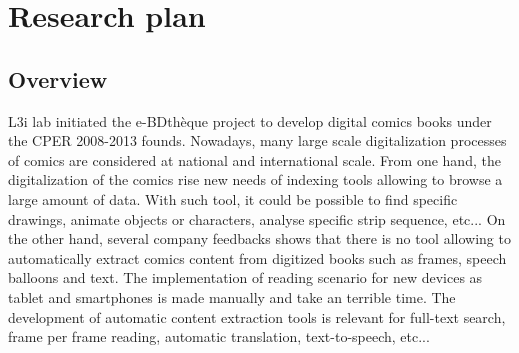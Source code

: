 \documentclass[final,12pt]{report} 						%
\begin{document}

\section{Research plan}
\subsection{Overview}
L3i lab initiated the e-BDthèque project to develop digital comics books under the CPER 2008-2013 founds. Nowadays, many large scale digitalization processes of comics are considered at national and international scale. From one hand, the digitalization of the comics rise new needs of indexing tools allowing to browse a large amount of data. With such tool, it could be possible to find specific drawings, animate objects or characters, analyse specific strip sequence, etc... On the other hand, several company feedbacks shows that there is no tool allowing to automatically extract comics content from digitized books such as frames, speech balloons and text. The implementation of reading scenario for new devices as tablet and smartphones is made manually and take an terrible time. The development of automatic content extraction tools is relevant for full-text search, frame per frame reading, automatic translation, text-to-speech, etc...


\end{document}

